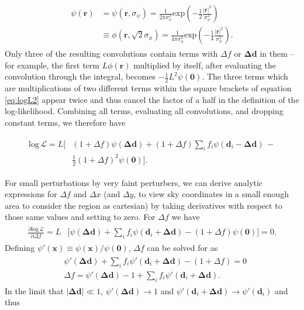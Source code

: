 \documentclass[fleqn,usenatbib]{mnras}
\begin{document}
\begin{align}
\begin{split}
    \psi(\mathbf{r}) &= \psi(\mathbf{r}, \sigma_\psi) = \frac{1}{2\pi \sigma_\psi^2}\mathrm{exp}\left(-\frac{1}{2} \frac{\lvert\mathbf{r}\lvert^2}{\sigma_\psi^2}\right) \\&\equiv \phi(\mathbf{r}, \sqrt{2}\sigma_\phi) = \frac{1}{4\pi \sigma_\phi^2}\mathrm{exp}\left(-\frac{1}{4} \frac{\lvert\mathbf{r}\lvert^2}{\sigma_\phi^2}\right).
\end{split}
\end{align}
Only three of the resulting convolutions contain terms with $\Delta f$ or $\mathbf{\Delta d}$ in them -- for example, the first term $L\phi(\mathbf{r})$ multiplied by itself, after evaluating the convolution through the integral, becomes $-\frac{1}{2} L^2 \psi(\mathbf{0})$. The three terms which are multiplications of two different terms within the square brackets of equation \ref{eq:logL2} appear twice and thus cancel the factor of a half in the definition of the log-likelihood. Combining all terms, evaluating all convolutions, and dropping constant terms, we therefore have

\begin{align}
\begin{split}
    \mathrm{log}\,\mathcal{L} = L \bigg[&(1 + \Delta f)\psi(\mathbf{\Delta d}) + (1 + \Delta f)\sum\limits_if_i\psi(\mathbf{d}_i - \mathbf{\Delta d})\,-\\&\frac{1}{2}(1 + \Delta f)^2\psi(\mathbf{0})\Bigg].
\end{split}
\end{align}

For small perturbations by very faint perturbers, we can derive analytic expressions for $\Delta f$ and $\Delta x$ (and $\Delta y$, to view sky coordinates in a small enough area to consider the region as cartesian) by taking derivatives with respect to those same values and setting to zero. For $\Delta f$ we have
\begin{align}
\begin{split}
    \frac{\partial\mathrm{log}\,\mathcal{L}}{\partial \Delta f} = L &\bigg[\psi(\mathbf{\Delta d}) + \sum\limits_if_i\psi(\mathbf{d}_i + \mathbf{\Delta d}) - (1 + \Delta f)\psi(\mathbf{0})\bigg] = 0.
\end{split}
\end{align}
Defining $\psi{'}(\mathbf{x}) \equiv \psi(\mathbf{x})/\psi(\mathbf{0})$, $\Delta f$ can be solved for as
\begin{align}
\begin{split}
    &\psi{'}(\mathbf{\Delta d}) + \sum\limits_if_i\psi{'}(\mathbf{d}_i + \mathbf{\Delta d}) - (1 + \Delta f) = 0\\
    &\Delta f = \psi{'}(\mathbf{\Delta d}) - 1 + \sum\limits_if_i\psi{'}(\mathbf{d}_i + \mathbf{\Delta d}).
\label{eq:dfderiv}
\end{split}
\end{align}
In the limit that $\lvert\mathbf{\Delta d}\lvert \ll 1$, $\psi{'}(\mathbf{\Delta d}) \to 1$ and $\psi{'}(\mathbf{d}_i + \mathbf{\Delta d}) \to \psi{'}(\mathbf{d}_i)$ and thus
\end{document}
